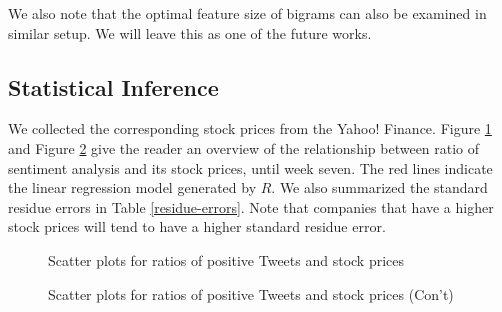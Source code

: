 \documentclass[12pt]{article}
\begin{document}
We also note that the optimal feature size of bigrams can also be examined in similar setup. We will leave this as one of the future works.

\subsection{Statistical Inference}
We collected the corresponding stock prices from the Yahoo! Finance. Figure \ref{xyplots-ratio-price} and Figure \ref{xyplots-ratio-price-02} give the reader an overview of the relationship between ratio of sentiment analysis and its stock prices, until week seven. The red lines indicate the linear regression model generated by $R$. We also summarized the standard residue errors in Table \ref{residue-errors}. Note that companies that have a higher stock prices will tend to have a higher standard residue error.

\begin{figure}
\centering
\caption{Scatter plots for ratios of positive Tweets and stock prices}
\label{xyplots-ratio-price}
\end{figure}

\begin{figure}
\centering
\caption{Scatter plots for ratios of positive Tweets and stock prices (Con't)}
\label{xyplots-ratio-price-02}
\end{figure}
\end{document}
